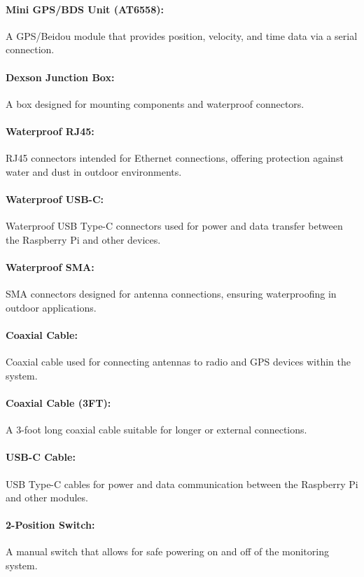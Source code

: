 \documentclass{article}
\begin{document}
\paragraph{Mini GPS/BDS Unit (AT6558):} A GPS/Beidou module that provides position, velocity, and time data via a serial connection.

\paragraph{Dexson Junction Box:} A box designed for mounting components and waterproof connectors.

\paragraph{Waterproof RJ45:} RJ45 connectors intended for Ethernet connections, offering protection against water and dust in outdoor environments.

\paragraph{Waterproof USB-C:} Waterproof USB Type-C connectors used for power and data transfer between the Raspberry Pi and other devices.

\paragraph{Waterproof SMA:} SMA connectors designed for antenna connections, ensuring waterproofing in outdoor applications.

\paragraph{Coaxial Cable:} Coaxial cable used for connecting antennas to radio and GPS devices within the system.

\paragraph{Coaxial Cable (3FT):} A 3-foot long coaxial cable suitable for longer or external connections.

\paragraph{USB-C Cable:} USB Type-C cables for power and data communication between the Raspberry Pi and other modules.

\paragraph{2-Position Switch:} A manual switch that allows for safe powering on and off of the monitoring system.
\end{document}
